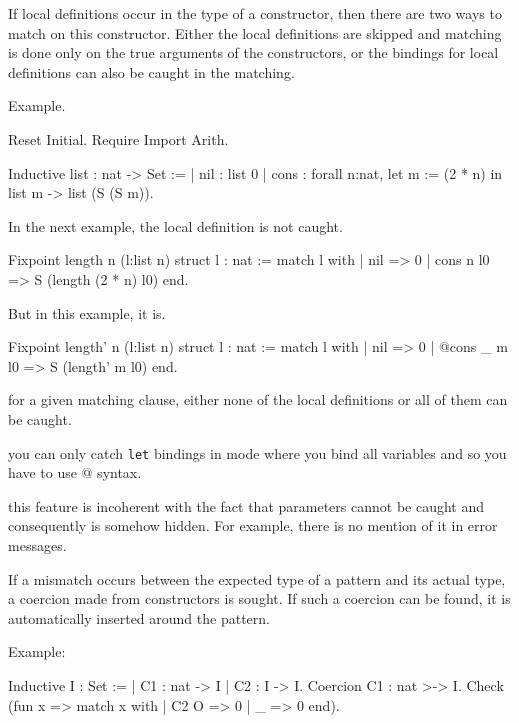 
If local definitions occur in the type of a constructor, then there are two ways
to match on this constructor. Either the local definitions are skipped and
matching is done only on the true arguments of the constructors, or the bindings
for local definitions can also be caught in the matching.

Example.

\begin{coq_eval}
Reset Initial.
Require Import Arith.
\end{coq_eval}

\begin{coq_example*}
Inductive list : nat -> Set :=
  | nil : list 0
  | cons : forall n:nat, let m := (2 * n) in list m -> list (S (S m)).
\end{coq_example*}

In the next example, the local definition is not caught.

\begin{coq_example}
Fixpoint length n (l:list n) {struct l} : nat :=
  match l with
  | nil => 0
  | cons n l0 => S (length (2 * n) l0)
  end.
\end{coq_example}

But in this example, it is.

\begin{coq_example}
Fixpoint length' n (l:list n) {struct l} : nat :=
  match l with
  | nil => 0
  | @cons _ m l0 => S (length' m l0)
  end.
\end{coq_example}

\Rem for a given matching clause, either none of the local definitions or all of
them can be caught.

\Rem you can only catch {\tt let} bindings in mode where you bind all variables and so you
have to use @ syntax.

\Rem this feature is incoherent with the fact that parameters cannot be caught and
consequently is somehow hidden. For example, there is no mention of it in error messages.


If a mismatch occurs between the expected type of a pattern and its
actual type, a coercion made from constructors is sought. If such a
coercion can be found, it is automatically inserted around the
pattern.

Example:

\begin{coq_example}
Inductive I : Set :=
  | C1 : nat -> I
  | C2 : I -> I.
Coercion C1 : nat >-> I.
Check (fun x => match x with
                | C2 O => 0
                | _ => 0
                end).
\end{coq_example}


